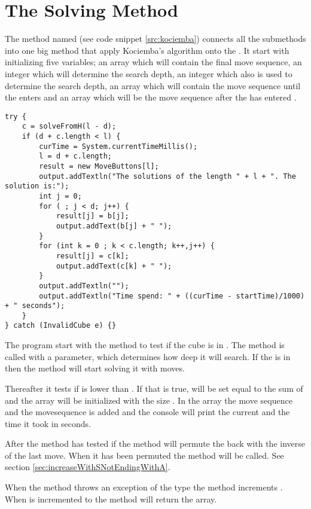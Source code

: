 \section{The Solving Method}
\label{sec:kSolve}
The method named  (see code snippet \ref{src:kociemba}) connects all the submethods into one big method that apply Kociemba's algorithm onto the \rubik{}. 
It start with initializing five variables; 
an array  which will contain the final move sequence, an integer  which will determine the search depth, 
an integer  which also is used to determine the search depth, 
an array  which will contain the move sequence until the \rubik{} enters  
and an array  which will be the move sequence after the \rubik{} has entered .

\begin{lstlisting}[style=sourceCode, caption=\myCaption{Key point in the solve method of kociemba's optimal solver}, label=src:kociemba]
try {
	c = solveFromH(l - d);
	if (d + c.length < l) {
		curTime = System.currentTimeMillis();
		l = d + c.length;
		result = new MoveButtons[l];
		output.addTextln("The solutions of the length " + l + ". The solution is:");
		int j = 0;
		for ( ; j < d; j++) {
			result[j] = b[j];
			output.addText(b[j] + " ");
		}
		for (int k = 0 ; k < c.length; k++,j++) {
			result[j] = c[k];
			output.addText(c[k] + " ");
		}
		output.addTextln("");
		output.addTextln("Time spend: " + ((curTime - startTime)/1000) + " seconds");
	}
} catch (InvalidCube e) {}
\end{lstlisting}

The program start with the  method to test if the cube is in . The method  is called with a parameter, which determines how deep it will search. If the \rubik{} is in  then the method will start solving it with  moves.

Thereafter it tests if  is lower than . 
If that is true,  will be set equal to the sum of  and the  array will be initialized with the size . 
In the  array the move sequence  and the movesequence  is added and the console will print the current  and the time it took in seconds.

After the method has tested if  the method will permute the \rubik{} back with the inverse of the last move. When it has been permuted the method  will be called. See section \ref{sec:increaseWithSNotEndingWithA}.

When the method  throws an exception of the type  the method increments . 
When  is incremented to  the method will return the  array.